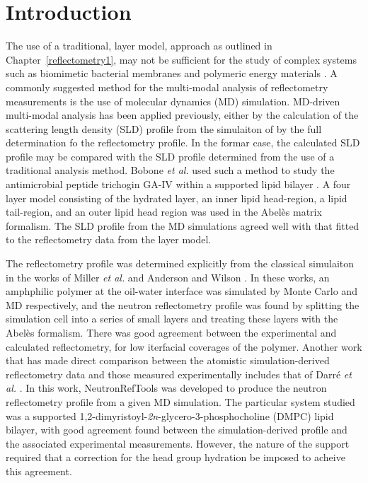 \section{Introduction}
The use of a traditional, layer model, approach as outlined in Chapter~\ref{reflectometry1}, may not be sufficient for the study of complex systems such as biomimetic bacterial membranes \cite{barker_neutron_2016} and polymeric energy materials \cite{khodakarimi_x-ray_2016}.
A commonly suggested method for the multi-modal analysis of reflectometry measurements is the use of molecular dynamics (MD) simulation.
MD-driven multi-modal analysis has been applied previously, either by the calculation of the scattering length density (SLD) profile from the simulaiton of by the full determination fo the reflectometry profile.
In the formar case, the calculated SLD profile may be compared with the SLD profile determined from the use of a traditional analysis method.
Bobone \emph{et al.} used such a method to study the antimicrobial peptide trichogin GA-IV within a supported lipid bilayer \cite{bobone_membrane_2013}.
A four layer model consisting of the hydrated  layer, an inner lipid head-region, a lipid tail-region, and an outer lipid head region was used in the Abel\`{e}s matrix formalism.
The SLD profile from the MD simulations agreed well with that fitted to the reflectometry data from the layer model.

The reflectometry profile was determined explicitly from the classical simulaiton in the works of Miller \emph{et al.} and Anderson and Wilson \cite{miller_monte_2003,anderson_molecular_2004}.
In these works, an amphphilic polymer at the oil-water interface was simulated by Monte Carlo and MD respectively, and the neutron reflectometry profile was found by splitting the simulation cell into a series of small layers and treating these layers with the Abel\`{e}s formalism.
There was good agreement between the experimental and calculated reflectometry, for low iterfacial coverages of the polymer.
Another work that has made direct comparison between the atomistic simulation-derived reflectometry data and those measured experimentally includes that of Darr\'{e} \emph{et al.} \cite{darre_molecular_2015}.
In this work, NeutronRefTools was developed to produce the neutron reflectometry profile from a given MD simulation.
The particular system studied was a supported 1,2-dimyristoyl-\emph{2n}-glycero-3-phosphocholine (DMPC) lipid bilayer, with good agreement found between the simulation-derived profile and the associated experimental measurements.
However, the nature of the support required that a correction for the head group hydration be imposed to acheive this agreement.


